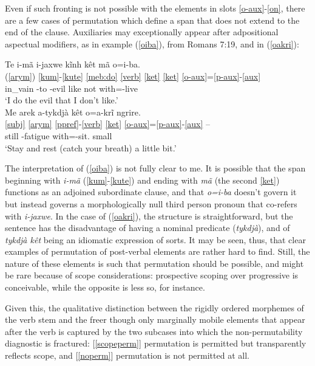 \documentclass[output=paper]{langscibook}
\begin{document}
Even if such fronting is not possible with the elements in slots \ref{o-aux}-\ref{on}, there are a few cases of permutation  which define a span that does not extend to the end of the clause. Auxiliaries may exceptionally appear after adpositional aspectual modifiers, as in example (\ref{oiba}), from Romans 7:19, and in (\ref{oakri}):

\ea\label{oiba}\glll Te	i-mã	i-jaxwe		kĩnh	kêt	mã	o=i-ba.\\
  (\ref{arym}) \ref{kum}-\ref{kute} \ref{meb:do} \ref{verb} \ref{ket} \ref{ket} \ref{o-aux}=\ref{p-aux}-\ref{aux}\\
	in\_vain	\First-to	\First-evil		like	not	\Prosp{}	with=\First-live\\
	\glt `I do the evil that I don't like.'\\
	\ex\label{oakri}\glll Me arek a-tykdjà kêt o=a-krĩ ngrire.\\
	           \ref{subj} \ref{arym} \ref{ppref}-\ref{verb} \ref{ket} \ref{o-aux}=\ref{p-aux}-\ref{aux} --\\
	           \Pl{} still \Second-fatigue \Neg{} with=\Second-sit.\Pl{} small\\
	        \glt `Stay and rest (catch your breath) a little bit.'
\z

The interpretation of (\ref{oiba}) is not fully clear to me. It is possible that the span beginning with {\em i-mã} (\ref{kum}-\ref{kute}) and ending with {\em mã} (the second \ref{ket}) functions as an adjoined subordinate clause, and that {\em o=i-ba} doesn't govern it but instead governs a morphologically null third person pronoun that co-refers with {\em i-jaxwe}. In the case of (\ref{oakri}), the structure is straightforward, but the sentence has the disadvantage of having a nominal predicate ({\em tykdjà}), and of {\em tykdjà kêt} being an idiomatic expression of sorts. It may be seen, thus, that clear examples of permutation of post-verbal elements are rather hard to find. Still, the nature of these elements is such that permutation should be possible, and might be rare because of scope considerations: prospective scoping over progressive is conceivable, while the opposite is less so, for instance.

Given this, the qualitative distinction between the rigidly ordered morphemes of the verb stem and the freer though only marginally mobile elements that appear after the verb is captured by the two subcases into which the non-permuta\-bil\-ity diagnostic is fractured: [\ref{scopeperm}] permutation is permitted but transparently reflects scope, and [\ref{noperm}] permutation is not permitted at all.
\end{document}
